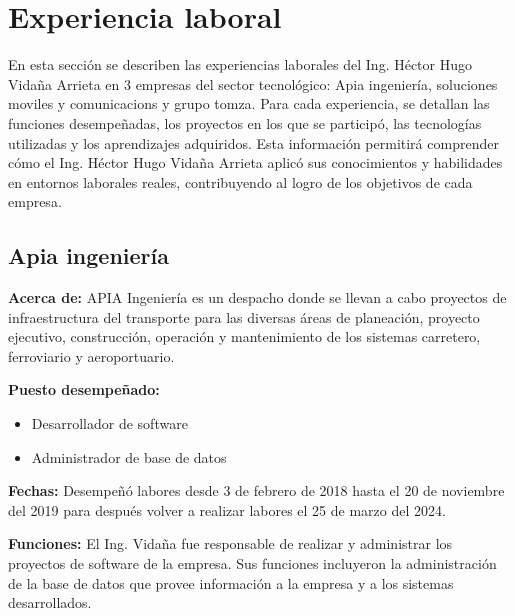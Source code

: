 \documentclass[protocolo.tex]{subfiles}
\begin{document}
\newpage 
\section{Experiencia laboral}

En esta sección se describen las experiencias laborales del Ing. 
Héctor Hugo Vidaña Arrieta en 3 empresas del sector tecnológico: 
Apia ingeniería, soluciones moviles y comunicacions y grupo tomza. 
Para cada experiencia, se detallan las funciones desempeñadas, 
los proyectos en los que se participó, las tecnologías utilizadas y 
los aprendizajes adquiridos. Esta información permitirá comprender cómo el 
Ing. Héctor Hugo Vidaña Arrieta aplicó sus conocimientos y habilidades en entornos laborales reales, contribuyendo al logro de los objetivos de cada empresa.

\subsection{Apia ingeniería}

\textbf{Acerca de:} 
APIA Ingeniería es un despacho donde se llevan a cabo proyectos de infraestructura del transporte para las diversas áreas de planeación, proyecto ejecutivo, construcción, operación y mantenimiento de los sistemas carretero, ferroviario y aeroportuario.

\textbf{Puesto desempeñado:} 
\begin{itemize}
\item Desarrollador de software
\item Administrador de base de datos
\end{itemize}

\textbf{Fechas:}
Desempeñó labores desde 3 de febrero de 2018 hasta el 20 de noviembre del 2019 para después volver a realizar labores el 25 de marzo del 2024.

\textbf{Funciones:}
El Ing. Vidaña fue responsable de realizar y administrar los proyectos de software de la empresa. Sus funciones incluyeron la administración de la base de datos que provee información a la empresa y a los sistemas desarrollados.
\end{document}
